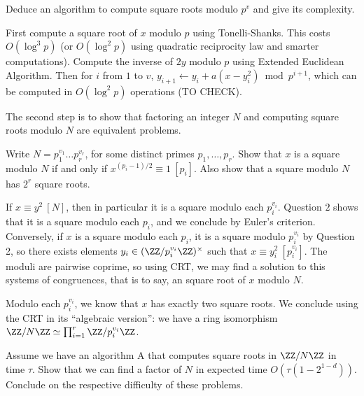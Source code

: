 \documentclass[11pt]{exam}
\theoremstyle{definition}
\begin{document}
{\begin{questions}
\begin{solution}
  \end{solution}

  \question Deduce an algorithm to compute square roots modulo $p^v$ and give its complexity.

  \begin{solution}
    First compute a square root of $x$ modulo $p$ using Tonelli-Shanks. This costs $O(\log^3 p)$ (or $O(\log^2 p)$ using quadratic reciprocity law and smarter computations). Compute the inverse of $2y$ modulo $p$ using Extended Euclidean Algorithm. Then for $i$ from $1$ to $v$, $y_{i+1} \gets y_i + a(x-y_i^2) \bmod p^{i+1}$, which can be computed in $O(\log^2 p)$ operations (TO CHECK).

  \end{solution}
  
  The second step is to show that factoring an integer $N$ and computing square roots modulo $N$ are equivalent problems.
  
  \question Write $N=p_1^{v_1}\dotsc p_r^{v_r}$, for some distinct primes $p_1, \dotsc, p_r$. Show that $x$ is a square modulo $N$ if and only if $x^{(p_i-1)/2}\equiv 1~[p_i]$. Also show that a square modulo $N$ has $2^r$ square roots.

  \begin{solution}
    If $x\equiv y^2~[N]$, then in particular it is a square modulo each $p_i^{v_i}$. Question $2$ shows that it is a square modulo each $p_i$, and we conclude by Euler's criterion. Conversely, if $x$ is a square modulo each $p_i$, it is a square modulo $p_i^{v_i}$ by Question 2, so there exists elements $y_i \in (\ZZ/p_i^{v_i}\ZZ)^\times$ such that $x\equiv y_i^2~[p_i^{v_i}]$. The moduli are pairwise coprime, so using CRT, we may find a solution to this systems of congruences, that is to say, an square root of $x$ modulo $N$.

    Modulo each $p_i^{v_i}$, we know that $x$ has exactly two square roots. We conclude using the CRT in its ``algebraic version'': we have a ring isomorphism $\ZZ/N\ZZ \simeq \prod_{i=1}^r \ZZ/p_i^{v_i}\ZZ$.
  \end{solution}
    \question Assume we have an algorithm {\sc A} that computes square roots in $\ZZ/N\ZZ$ in time $\tau$. Show that we can find a factor of $N$ in expected time $O(\tau(1-2^{1-d}))$. Conclude on the respective difficulty of these problems.


\end{questions}}
\end{document}
